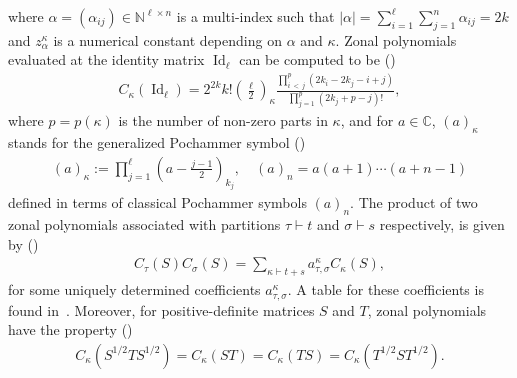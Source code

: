 \documentclass[AHL,Unicode,longabstracts,published]{cedram}
\DeclareMathOperator{\Id}{Id}
\newcommand{\N}{\mathbb{N}}
\newcommand{\C}{\mathbb{C}}
\begin{document}
where $\alpha=(\alpha_{ij}) \in \N^{\ell \times n}$ is a multi-index such that $|\alpha|=\sum_{i=1}^{\ell}\sum_{j=1}^n \alpha_{ij}=2k$ and $z_{\alpha}^{\kappa}$ is a numerical constant depending on $\alpha$ and $\kappa$. Zonal polynomials evaluated at the identity matrix $\Id_{\ell}$ can be computed to be (\cite[Eq.(A.2.7)]{Ch2012})
\begin{gather*}
C_{\kappa}(\Id_{\ell}) = 2^{2k}k! \left(\frac{\ell}{2}\right)_{\kappa}
\frac{\prod_{i\,<\,j}^p (2k_i-2k_j-i+j)}{\prod_{j=1}^p (2k_j+p-j)!},
\end{gather*}
where $p=p(\kappa)$ is the number of non-zero parts in $\kappa$, and for $a \in \C$, $(a)_{\kappa} $ stands for the generalized Pochammer symbol (\cite[Eq.~(A.2.4)]{Ch2012})
\begin{gather}\label{PochGen}
(a)_{\kappa} := \prod_{j=1}^{\ell} \left(a-\frac{j-1}{2}\right)_{k_j}, \quad (a)_{n} = a(a+1)\cdots(a+n-1)
\end{gather}
defined in terms of classical Pochammer symbols $(a)_n$. The product of two zonal polynomials associated with partitions $\tau \vdash t$ and $\sigma \vdash s$ respectively, is given by (\cite[Eq.~(4.3.65)]{BFZP})
\begin{gather}\label{akt}
C_{\tau}(S) C_{\sigma}(S) = \sum_{\kappa \vdash t+s} a_{\tau,\sigma}^{\kappa} C_{\kappa}(S),
\end{gather}
for some uniquely determined coefficients $a_{\tau,\sigma}^{\kappa}$. A table for these coefficients is found in~\cite[Table~4.3.2(a)]{BFZP}. Moreover, for positive-definite matrices $S$ and $T$, zonal polynomials have the property (\cite[Eq.~(4.3.18)]{BFZP})
\begin{gather}\label{Inv}
C_{\kappa}\left(S^{1/2}TS^{1/2}\right)=C_{\kappa}(ST)=C_{\kappa}(TS)=C_{\kappa}\left(T^{1/2}ST^{1/2}\right).
\end{gather}
\end{document}
